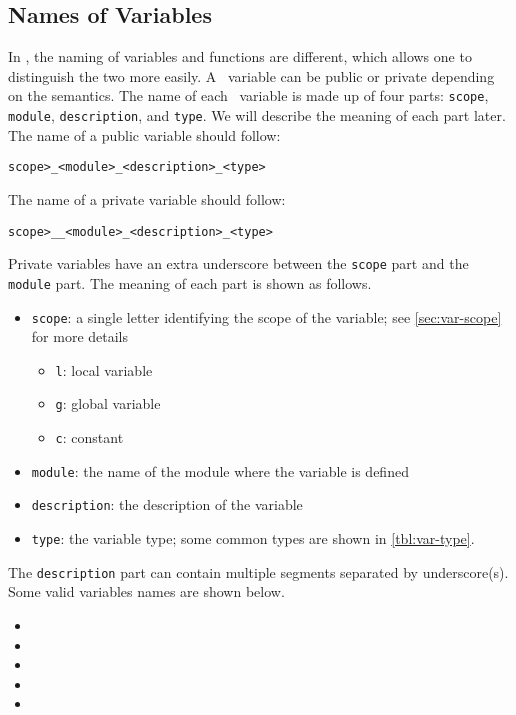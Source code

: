 \documentclass{ltugboat}
\begin{document}
\subsection{Names of Variables}\label{sec:name-of-variables}
In \liii, the naming of variables and functions are different, which allows one to distinguish the two more easily. 
A \liii\ variable can be public or private depending on the semantics.
The name of each \liii\ variable is made up of four parts: \texttt{scope}, \texttt{module}, \texttt{description}, and \texttt{type}. 
We will describe the meaning of each part later.
The name of a public variable should follow:
\begin{center}
\texttt{\string\<scope>\_<module>\_<description>\_<type>}
\end{center}
The name of a private variable should follow:
\begin{center}
\texttt{\string\<scope>\_\_<module>\_<description>\_<type>}
\end{center}
Private variables have an extra underscore between the \texttt{scope} part and the \texttt{module} part.
The meaning of each part is shown as follows.
\begin{itemize}
\item \texttt{scope}: a single letter identifying the scope of the variable; see \cref{sec:var-scope} for more details
\begin{itemize}
\item \texttt{l}: local variable
\item \texttt{g}: global variable
\item \texttt{c}: constant
\end{itemize}
\item \texttt{module}: the name of the module where the variable is defined
\item \texttt{description}: the description of the variable
\item \texttt{type}: the variable type; some common types are shown in \cref{tbl:var-type}.
\end{itemize}
The \texttt{description} part can contain multiple segments separated by underscore(s). 
Some valid variables names are shown below.
\begin{itemize}
\item {}
\item {}
\item {}
\item {}
\item {}
\end{itemize}
\end{document}
